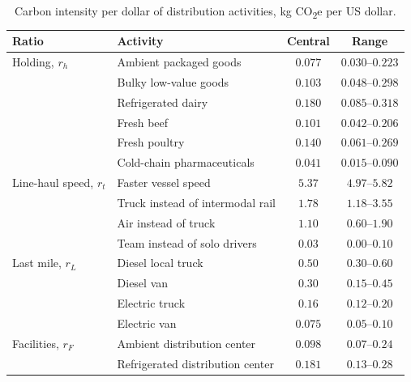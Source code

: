 \documentclass[11pt]{article}
\theoremstyle{definition}
\theoremstyle{remark}
\theoremstyle{plain}
\begin{document}
\begin{table}[t]
\centering\small
\caption{Carbon intensity per dollar of distribution activities, kg CO\textsubscript{2}e per US dollar.}
\label{tab:ratios}
\begin{tabular}{@{}llcc@{}}
\toprule
Ratio & Activity & Central & Range\\
\midrule
Holding, $r_h$            & Ambient packaged goods            & $0.077$ & $0.030$--$0.223$\\
                          & Bulky low-value goods             & $0.103$ & $0.048$--$0.298$\\
                          & Refrigerated dairy                & $0.180$ & $0.085$--$0.318$\\
                          & Fresh beef                        & $0.101$ & $0.042$--$0.206$\\
                          & Fresh poultry                     & $0.140$ & $0.061$--$0.269$\\
                          & Cold-chain pharmaceuticals        & $0.041$ & $0.015$--$0.090$\\
\addlinespace
Line-haul speed, $r_t$    & Faster vessel speed               & $5.37$  & $4.97$--$5.82$\\
                          & Truck instead of intermodal rail  & $1.78$  & $1.18$--$3.55$\\
                          & Air instead of truck              & $1.10$  & $0.60$--$1.90$\\
                          & Team instead of solo drivers      & $0.03$  & $0.00$--$0.10$\\
\addlinespace
Last mile, $r_L$          & Diesel local truck                & $0.50$  & $0.30$--$0.60$\\
                          & Diesel van                        & $0.30$  & $0.15$--$0.45$\\
                          & Electric truck                    & $0.16$  & $0.12$--$0.20$\\
                          & Electric van                      & $0.075$ & $0.05$--$0.10$\\
\addlinespace
Facilities, $r_F$         & Ambient distribution center       & $0.098$ & $0.07$--$0.24$\\
                          & Refrigerated distribution center  & $0.181$ & $0.13$--$0.28$\\
\bottomrule
\end{tabular}
\end{table}
\end{document}
